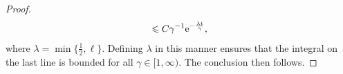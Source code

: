 \documentclass[11pt,a4paper]{article}
\begin{document}
\begin{proof}
\begin{align}
        \leqslant C  \gamma^{-1} \mathrm{e}^{-\frac{\lambda t}{\gamma}},
    \end{align}
    where $\lambda = \min \{\frac{1}{2}, \ell \}$.
    Defining $\lambda$ in this manner ensures that the integral on the last line is bounded for all $\gamma \in [1, \infty)$.
    The conclusion then follows.
\end{proof}
\end{document}
